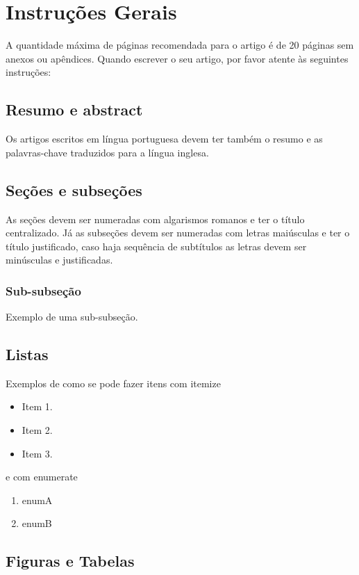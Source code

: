 \section{Instruções Gerais}
\label{sec:instruções}

A quantidade máxima de páginas recomendada para o artigo é de 20 páginas sem anexos ou apêndices.
Quando escrever o seu artigo, por favor atente às seguintes instruções:

\subsection{Resumo e abstract}
Os artigos escritos em língua portuguesa devem ter também o resumo e as palavras-chave traduzidos para a língua inglesa.

\subsection{Seções e subseções}
As seções devem ser numeradas com algarismos romanos e ter o título centralizado. Já as subseções devem ser numeradas com letras maiúsculas e ter o título justificado, caso haja sequência de subtítulos as letras devem ser minúsculas e justificadas. 

\subsubsection{Sub-subseção}

Exemplo de uma sub-subseção.

\subsection{Listas}

Exemplos de como se pode fazer itens com itemize

\begin{itemize}
\item Item 1.
\item Item 2.
\item Item 3.
\end{itemize}

e com enumerate

\begin{enumerate}
 \item enumA
 \item enumB
\end{enumerate}

\subsection{Figuras e Tabelas}

